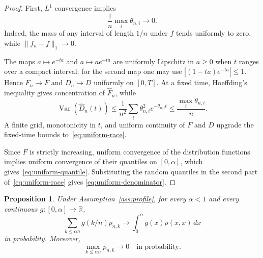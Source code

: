 \documentclass[11pt]{article}
\newtheorem{proposition}[theorem]{Proposition}
\theoremstyle{remark}
\theoremstyle{plain}
\newcommand{\R}{\mathbb R}
\newcommand{\Var}{\operatorname{Var}}
\begin{document}
\begin{proof}
First, $L^1$ convergence implies
\begin{equation}\label{eq:max-weight}
 \frac1n\max_i\theta_{n,i}\longrightarrow0.
\end{equation}
Indeed, the mass of any interval of length $1/n$ under $f$ tends uniformly to
zero, while $\lVert f_n-f\rVert_1\to0$.

The maps $a\mapsto e^{-ta}$ and $a\mapsto ae^{-ta}$ are uniformly Lipschitz
in $a\ge0$ when $t$ ranges over a compact interval; for the second map one may
use $|(1-ta)e^{-ta}|\le1$.  Hence $F_n\to F$ and $D_n\to D$ uniformly on
$[0,T]$.  At a fixed time, Hoeffding's inequality gives concentration of
$\widehat F_n$, while
\[
 \Var(\widehat D_n(t))
 \le \frac1{n^2}\sum_i\theta_{n,i}^2e^{-\theta_{n,i}t}
 \le \frac{\max_i\theta_{n,i}}n.
\]
A finite grid, monotonicity in $t$, and uniform continuity of $F$ and $D$
upgrade the fixed-time bounds to~\eqref{eq:uniform-race}.

Since $F$ is strictly increasing, uniform convergence of the distribution
functions implies uniform convergence of their quantiles on $[0,\alpha]$,
which gives~\eqref{eq:uniform-quantile}.  Substituting the random quantiles in
the second part of~\eqref{eq:uniform-race} gives
\eqref{eq:uniform-denominator}.
\end{proof}

\begin{proposition}\label{prop:interior-compensator}
Under Assumption~\ref{ass:profile}, for every $\alpha<1$ and every continuous
$g:[0,\alpha]\to\R$,
\begin{equation}\label{eq:weighted-compensator}
 \sum_{k\le\alpha n}g(k/n)p_{n,k}
 \longrightarrow
 \int_0^\alpha g(x)\rho(x,x)\,dx
\end{equation}
in probability.  Moreover,
\begin{equation}\label{eq:interior-max-p}
 \max_{k\le\alpha n}p_{n,k}\longrightarrow0
 \quad\text{in probability}.
\end{equation}
\end{proposition}
\end{document}
